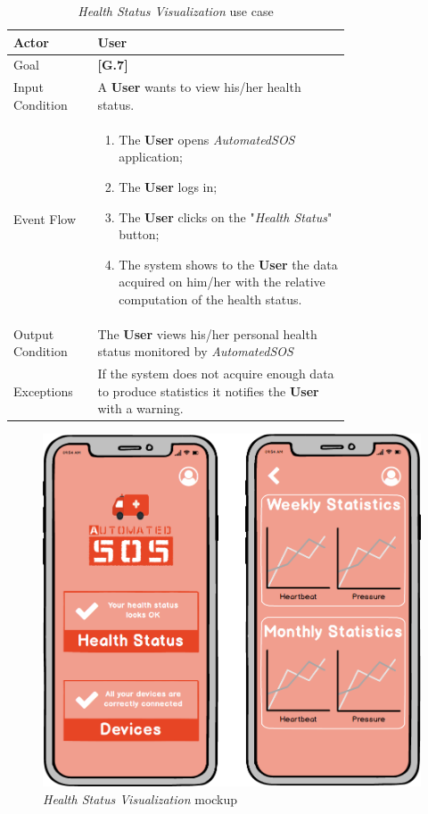\begin{center}
\begin{table}
\begin{tabular}{ | l | p{0.75\linewidth} | }
  \hline
    Actor & \textbf{User} \\ \hline
    Goal & \textbf{[G.7]} \\ \hline
    Input Condition & A \textbf{User} wants to view his/her health status.\\ \hline
    Event Flow & \begin{minipage}[t]{0.7\textwidth}
      \begin{enumerate}
        \item The \textbf{User} opens \textit{AutomatedSOS} application;
        \item The \textbf{User} logs in;
        \item The \textbf{User} clicks on the "\textit{Health Status}" button;
        \item The system shows to the \textbf{User} the data acquired on him/her with the relative computation of the health status.
      \end{enumerate}
    \smallskip
  \end{minipage} \\ \hline
  Output Condition & The \textbf{User} views his/her personal health status monitored by \textit{AutomatedSOS}\\ \hline
  Exceptions & If the system does not acquire enough data to produce statistics it notifies the \textbf{User} with a warning.  \\ \hline
\end{tabular}
\caption{\textit{Health Status Visualization} use case}
\label{table:healthStatus}
\end{table}
\end{center}

\begin{figure}
\begin{center}
  \includegraphics[width=\textwidth]{img/mockup/Health_Status.png}
  \hspace{0.05\linewidth}
  \centering
  \caption{\textit{Health Status Visualization} mockup}
  \label{img:healthStatusMockup}
\end{center}
\end{figure}
